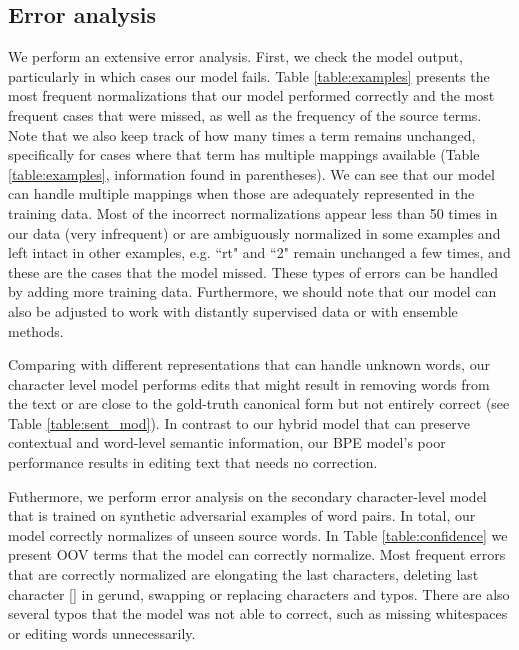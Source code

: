 \documentclass[letterpaper]{article} \usepackage{aaai19}  \usepackage{times}  \usepackage{helvet} \usepackage{courier}  \usepackage[hyphens]{url}  \usepackage{graphicx} \urlstyle{rm} \def\UrlFont{\rm}  \usepackage{graphicx}  \frenchspacing  \setlength{\pdfpagewidth}{8.5in}  \setlength{\pdfpageheight}{11in}
\begin{document}
\subsection{Error analysis}
We perform an extensive error analysis. First, we check the model output, particularly in which cases our model fails. Table \ref{table:examples} presents the most frequent normalizations that our model performed correctly and the most frequent cases that were missed, as well as the frequency of the source terms. Note that we also keep track of how many times a term remains unchanged, specifically for cases where that term has multiple mappings available  (Table \ref{table:examples}, information found in parentheses). We can see that our model can handle multiple mappings when those are adequately represented in the training data. Most of the incorrect normalizations appear less than 50 times in our data (very infrequent) or are ambiguously normalized in some examples and left intact in other examples, e.g. ``rt" and ``2" remain unchanged a few times, and these are the cases that the model missed.  These types of errors can be handled by adding more training data. Furthermore, we should note that our model can also be adjusted to work with distantly supervised data or with ensemble methods.

Comparing with different representations that can handle unknown words, our character level model performs edits that might result in removing words from the text or are close to the gold-truth canonical form but not entirely correct (see Table \ref{table:sent_mod}). In contrast to our hybrid model that can preserve contextual and word-level semantic information, our BPE model's poor performance results in editing text that needs no correction.

Futhermore, we perform error analysis on the secondary character-level model that is trained on synthetic adversarial examples of word pairs. In total, our model correctly normalizes  of unseen source words. In Table \ref{table:confidence} we present OOV terms that the model can correctly normalize. Most frequent errors that are correctly normalized are elongating the last characters, deleting last character [] in gerund, swapping or replacing characters and typos. There are also several typos that the model was not able to correct, such as missing whitespaces or editing words unnecessarily. 
\end{document}
